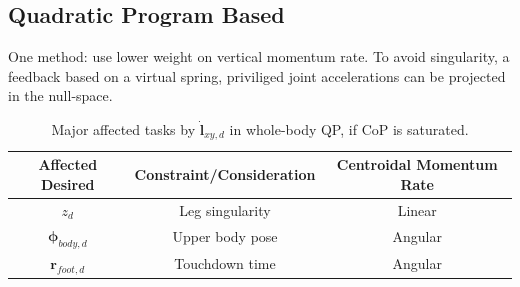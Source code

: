 \subsection{Quadratic Program Based}
One method: use lower weight on vertical momentum rate. To avoid singularity, a feedback based on a virtual spring, priviliged joint accelerations can be projected in the null-space. 

\begin{table}[ht]
\caption{Major affected tasks by $\mathbf{\dot{l}}_{xy,d}$ in whole-body QP, if \ac{CoP} is saturated.} %
\centering %
\begin{tabular}{c c c } %
\hline\hline %
Affected Desired & Constraint/Consideration & Centroidal Momentum Rate \\
\hline %
 $z_d$ & Leg singularity & Linear\\
 $\boldsymbol{\phi}_{body,d}$ & Upper body pose & Angular\\
 $\mathbf{r}_{foot,d}$ &  Touchdown time & Angular\\
\hline %
\end{tabular}
\label{tab:eatqp} %
\end{table}
